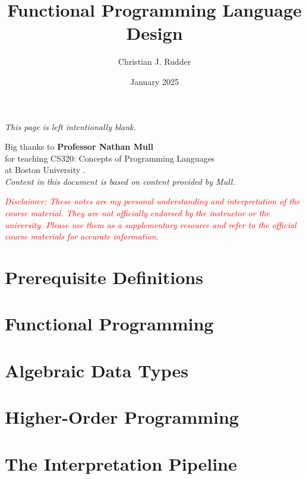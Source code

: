 \documentclass{memoir}
\title{Functional Programming Language Design}
\author{Christian J. Rudder}
\date{January 2025}
\begin{document}
\maketitle
\setcounter{secnumdepth}{2} %
\setcounter{tocdepth}{2}

\tableofcontents

\newpage
\thispagestyle{empty}
\mbox{}
\vfill
\begin{center}
    \textit{This page is left intentionally blank.}
\end{center}
\vfill
\newpage
\thispagestyle{empty}
\mbox{}
\vfill
\begin{center}
    \Large{Big thanks to \textbf{Professor Nathan Mull}}\\
    \normalsize 
    for teaching CS320: Concepts of Programming Languages\\
    at Boston University \cite{mull_cs320}.\\
    \textit{Content in this document is based on content provided by Mull.}\\
    \vfill
    \begin{center}
        \textcolor{red}{\textit{Disclaimer: These notes are my personal understanding and interpretation of the course material. 
        They are not officially endorsed by the instructor or the university. Please use them as a supplementary resource and refer 
        to the official course materials for accurate information.}}
    \end{center}
\end{center}

\vfill

\chapter*{Prerequisite Definitions}


\chapter{Functional Programming}





\chapter {Algebraic Data Types}


\chapter{Higher-Order Programming}




\chapter{The Interpretation Pipeline}


\end{document}

